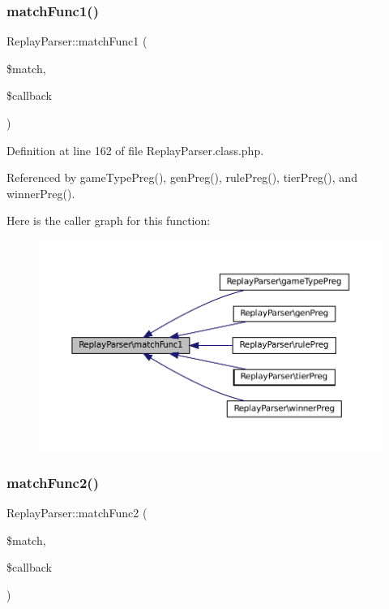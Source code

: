 \subsubsection{\texorpdfstring{match\+Func1()}{matchFunc1()}}
{\footnotesize\ttfamily Replay\+Parser\+::match\+Func1 (\begin{DoxyParamCaption}\item[{}]{\$match,  }\item[{}]{\$callback }\end{DoxyParamCaption})}



Definition at line 162 of file Replay\+Parser.\+class.\+php.



Referenced by game\+Type\+Preg(), gen\+Preg(), rule\+Preg(), tier\+Preg(), and winner\+Preg().

Here is the caller graph for this function\+:\nopagebreak
\begin{figure}[H]
\begin{center}
\leavevmode
\includegraphics[width=350pt]{class_replay_parser_aaeed5f1f75f5699b789c615382badb88_icgraph}
\end{center}
\end{figure}
\mbox{\label{class_replay_parser_aeacf15eaec9b2286ec8d2f115da79dbc}} 
\subsubsection{\texorpdfstring{match\+Func2()}{matchFunc2()}}
{\footnotesize\ttfamily Replay\+Parser\+::match\+Func2 (\begin{DoxyParamCaption}\item[{}]{\$match,  }\item[{}]{\$callback }\end{DoxyParamCaption})}



